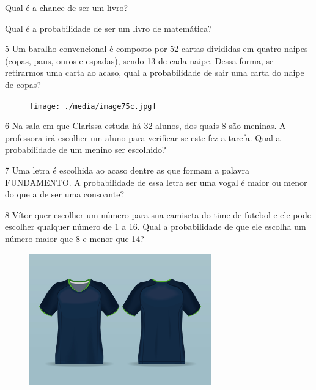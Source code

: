 \begin{escolha}
\item Qual é a chance de ser um livro?

\item  Qual é a probabilidade de ser um livro de matemática?
\end{escolha}
\num{5} Um baralho convencional é composto por 52 cartas divididas em quatro
naipes (copas, paus, ouros e espadas), sendo 13 de cada naipe. Dessa
forma, se retirarmos uma carta ao acaso, qual a probabilidade de sair
uma carta do naipe de copas?

\begin{figure}[htpb!]
\centering
\texttt{[image: ./media/image75c.jpg]}
\end{figure}


\num{6} Na sala em que Clarissa estuda há 32 alunos, dos quais 8 são meninas. A
professora irá escolher um aluno para verificar se este fez a tarefa.
Qual a probabilidade de um menino ser escolhido?

\num{7} Uma letra é escolhida ao acaso dentre as que formam a palavra
FUNDAMENTO. A probabilidade de essa letra ser uma vogal é maior ou menor do que a de ser uma consoante?


\num{8} Vítor quer escolher um número para sua camiseta do time de futebol e ele
pode escolher qualquer número de 1 a 16. Qual a probabilidade de que ele
escolha um número maior que 8 e menor que 14?

\begin{figure}[htpb!]
\centering
\includegraphics[width=0.7\textwidth]{./media/image75d.jpg}
\end{figure}

